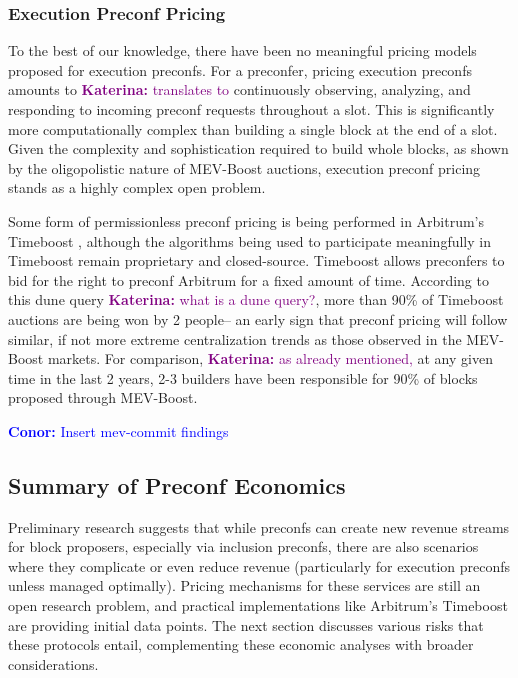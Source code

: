 \documentclass[a4paper]{article}
\theoremstyle{boldstyle}
\newcommand{\cm}[1]{\textcolor{blue}{\textbf{Conor:} #1}}
\newcommand{\ks}[1]{\textcolor{purple}{\textbf{Katerina:} #1}}
\begin{document}
    \subsubsection{Execution Preconf Pricing}

    To the best of our knowledge, there have been no meaningful pricing models proposed for execution preconfs. For a preconfer, pricing execution preconfs amounts to \ks{translates to} continuously observing, analyzing, and responding to incoming preconf requests throughout a slot. This is significantly more computationally complex than building a single block at the end of a slot. Given the complexity and sophistication required to build whole blocks, as shown by the oligopolistic nature of MEV-Boost auctions, execution preconf pricing stands as a highly complex open problem. 
    
    Some form of permissionless preconf pricing is being performed in Arbitrum's Timeboost \cite{TimeBoostDocs}, although the algorithms being used to participate meaningfully in Timeboost remain proprietary and closed-source. Timeboost allows preconfers to bid for the right to preconf Arbitrum for a fixed amount of time. According to this dune query \cite{TimeboostAuctionWinnerBreakdown} \ks{what is a dune query?}, more than 90\% of Timeboost auctions are being won by 2 people-- an early sign that preconf pricing will follow similar, if not more extreme centralization trends as those observed in the MEV-Boost markets. For comparison, \ks{as already mentioned,} at any given time in the last 2 years, 2-3 builders have been responsible for 90\% of blocks proposed through MEV-Boost\cite{MEVBoostShares}.

    \cm{Insert mev-commit findings}

    

    \subsection{Summary of Preconf Economics}

    Preliminary research suggests that while preconfs can create new revenue streams for block proposers, especially via inclusion preconfs, there are also scenarios where they complicate or even reduce revenue (particularly for execution preconfs unless managed optimally). Pricing mechanisms for these services are still an open research problem, and practical implementations like Arbitrum’s Timeboost are providing initial data points. The next section discusses various risks that these protocols entail, complementing these economic analyses with broader considerations.
\end{document}
